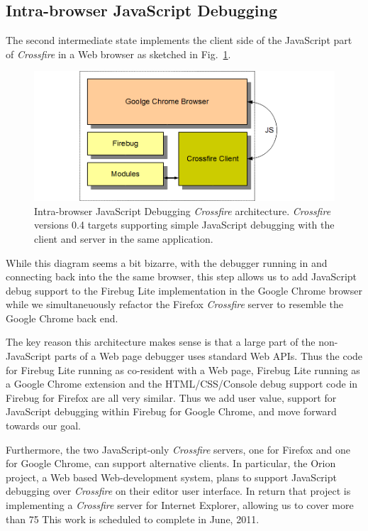 \subsection{Intra-browser JavaScript Debugging}
The second intermediate state implements the client side of the JavaScript part of \textit{Crossfire} in 
a Web browser as sketched in Fig.~\ref{fig:fbugChrome}. 
\begin{figure}[htp]
  \includegraphics  [width = 86 mm] {figures/fbugChrome.png}
  \caption{Intra-browser JavaScript Debugging \textit{Crossfire} architecture. 
\textit{Crossfire} versions 0.4 targets supporting simple JavaScript debugging with the client and server in the same application.}
 \label{fig:fbugChrome}
\end{figure}
While this diagram seems a bit bizarre, with the 
debugger running in and connecting back into the the same browser, this step allows us to add JavaScript debug
support to the Firebug Lite implementation in the Google Chrome browser while we simultaneuously refactor 
the Firefox  \textit{Crossfire} server to resemble the Google Chrome back end.  

The key reason this architecture makes sense is that a large part of the non-JavaScript parts of a Web page
debugger uses standard Web APIs. Thus the code for Firebug Lite running as co-resident with a Web page, 
Firebug Lite running as a Google Chrome extension and the HTML/CSS/Console debug support code in Firebug 
for Firefox are all very similar.   Thus we add user value, support for JavaScript debugging within Firebug for Google Chrome, 
and move forward towards our goal.

Furthermore, the two JavaScript-only \textit{Crossfire} servers, one for Firefox and one for Google Chrome, can support 
alternative clients. In particular, the Orion project, a Web based Web-development system, plans to support 
JavaScript debugging over \textit{Crossfire} on their editor user interface. In return that project is implementing a \textit{Crossfire}
server for Internet Explorer, allowing us to cover more than 75%
This work is scheduled to complete in June, 2011.

